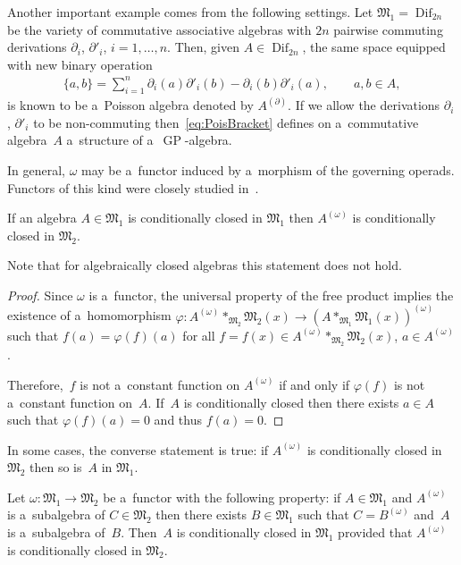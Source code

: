 Another important example comes from the following settings.
Let $\mathfrak M_1 = \operatorname{Dif}_{2n}$ be the variety of commutative associative algebras with $2n$ pairwise commuting
derivations $\partial_i$, $\partial'_i$, $i=1,\dots, n$.
Then, given $A\in \operatorname{Dif}_{2n}$, the same space equipped with new binary operation
\begin{gather}
\label{eq:PoisBracket}
\{a,b\} = \sum\limits_{i=1}^n \partial_i(a)\partial'_i(b) - \partial_i(b)\partial'_i(a),
\qquad
a,b\in A,
\end{gather}
is known to be a~Poisson algebra denoted by $A^{(\partial)}$.
If we allow the derivations $\partial_i$, $\partial'_i$ to be non-commuting then~\eqref{eq:PoisBracket} def\/ines on
a~commutative algebra~$A$ a~structure of a~$\operatorname{GP}$-algebra.

In general, $\omega $ may be a~functor induced by a~morphism of the governing operads.
Functors of this kind were closely studied in~\cite{MikSh2013}.

\begin{proposition}
\label{prop:CCFunctor}
If an algebra $A\in \mathfrak M_1$ is conditionally closed in $\mathfrak M_1$ then $A^{(\omega)}$ is conditionally
closed in $\mathfrak M_2$.
\end{proposition}

Note that for algebraically closed algebras this statement does not hold.

\begin{proof}
Since $\omega $ is a~functor, the universal property of the free product implies the existence of a~homomorphism
$\varphi: A^{(\omega)}*_{\mathfrak M_2} \mathfrak M_2(x) \to (A*_{\mathfrak M_1} \mathfrak M_1(x))^{(\omega)} $ such
that $f(a)=\varphi(f)(a)$ for all $f=f(x)\in A^{(\omega)}*_{\mathfrak M_2} \mathfrak M_2(x)$, $a\in A^{(\omega)}$.

Therefore,~$f$ is not a~constant function on $A^{(\omega)}$ if and only if $\varphi(f)$ is not a~constant function
on~$A$.
If~$A$ is conditionally closed then there exists $a\in A$ such that $\varphi(f)(a)=0$ and thus $f(a)=0$.
\end{proof}

In some cases, the converse statement is true: if $A^{(\omega)}$ is conditionally closed in $\mathfrak M_2$ then so
is~$A$ in $\mathfrak M_1$.

\begin{remark}
\label{rem:CCAlgebras_const}
Let $\omega: \mathfrak M_1 \to \mathfrak M_2$ be a~functor with the following property: if $A\in \mathfrak M_1$ and
$A^{(\omega)}$ is a~subalgebra of $C\in \mathfrak M_2$ then there exists $B\in \mathfrak M_1$ such that $C=B^{(\omega)}$
and~$A$ is a~subalgebra of~$B$.
Then~$A$ is conditionally closed in $\mathfrak M_1$ provided that $A^{(\omega)}$ is conditionally closed in $\mathfrak
M_2$.
\end{remark}


